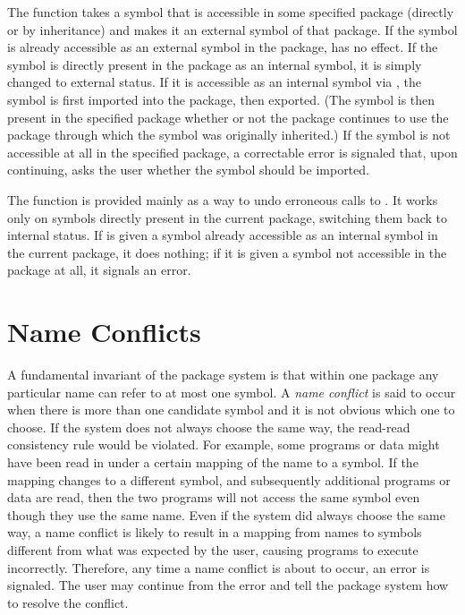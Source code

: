 The function  takes a symbol that is accessible in some
specified package (directly or by inheritance) and makes it an external
symbol of that package.  If the symbol is already accessible as an
external symbol in the package,  has no effect.  If the symbol
is directly present in the package as an internal symbol, it is simply
changed to external status.  If it is accessible as an internal symbol
via , the symbol is first imported into the package, then
exported.  (The symbol is then present in the specified package
whether or not the package
continues to use the package through which the symbol was originally
inherited.)  If the symbol is not
accessible at all in the specified package, a correctable error is
signaled that, upon continuing, asks the user whether the symbol
should be imported.

The function  is provided mainly as a way to undo erroneous
calls to .  It works only on symbols directly present
in the current package, switching them back to internal status.  If
 is given a symbol already accessible as an internal
symbol in the current package, it does nothing; if it is given a symbol
not accessible in the package at all, it signals an error.

\section{Name Conflicts}
\label{NAME-CONFLICTS-SECTION}

A fundamental invariant of the package system is that within one package
any particular name can refer to at most one symbol.  A {\it name conflict}
is said to occur when there is more than one candidate symbol and it is
not obvious which one to choose.  If the system does not always choose
the same way, the read-read consistency rule would be violated.  For
example, some programs or data might have been read in under a certain
mapping of the name to a symbol.  If the mapping changes to a different
symbol, and subsequently additional programs or data are read,
then the two programs will
not access the same symbol even though they use the same name.  Even if
the system did always choose the same way, a name conflict is likely to
result in a mapping from names to symbols different from what was expected by
the user, causing programs to execute incorrectly.  Therefore, any time
a name conflict is about to occur,
an error is signaled.  The user may continue
from the error and tell the package system how to resolve the conflict.

